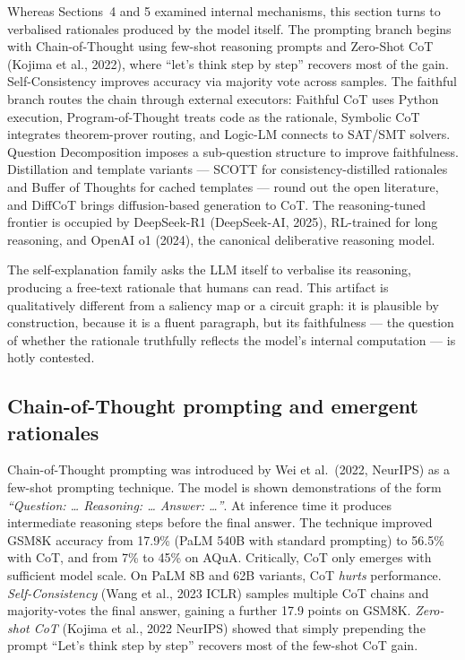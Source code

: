 \documentclass{article}
\begin{document}
Whereas Sections~4 and 5 examined internal mechanisms, this section turns to verbalised rationales produced by the model itself. The prompting branch begins with Chain-of-Thought \citep{wei2022chainofthoughtprom} using few-shot reasoning prompts and Zero-Shot CoT (Kojima et al., 2022), where ``let's think step by step'' recovers most of the gain. Self-Consistency \citep{wang2023scottselfconsisten} improves accuracy via majority vote across samples. The faithful branch routes the chain through external executors: Faithful CoT \citep{lyu2023faithfulchainoftho} uses Python execution, Program-of-Thought \citep{chen2024diahaluadialoguele} treats code as the rationale, Symbolic CoT \citep{xu2024faithfullogicalrea} integrates theorem-prover routing, and Logic-LM \citep{pan2023logiclmempoweringl} connects to SAT/SMT solvers. Question Decomposition \citep{radhakrishnan2023questiondecomposit} imposes a sub-question structure to improve faithfulness. Distillation and template variants --- SCOTT \citep{wang2023scottselfconsisten} for consistency-distilled rationales and Buffer of Thoughts \citep{yang2024bufferofthoughtsth} for cached templates --- round out the open literature, and DiffCoT \citep{cao2026diffcotdiffusionst} brings diffusion-based generation to CoT. The reasoning-tuned frontier is occupied by DeepSeek-R1 (DeepSeek-AI, 2025), RL-trained for long reasoning, and OpenAI o1 (2024), the canonical deliberative reasoning model.

The self-explanation family asks the LLM itself to verbalise its reasoning, producing a free-text rationale that humans can read. This artifact is qualitatively different from a saliency map or a circuit graph: it is plausible by construction, because it is a fluent paragraph, but its faithfulness --- the question of whether the rationale truthfully reflects the model's internal computation --- is hotly contested.

\subsection{Chain-of-Thought prompting and emergent rationales}\label{chain-of-thought-prompting-and-emergent-rationales}

Chain-of-Thought prompting was introduced by Wei et al.~(2022, NeurIPS) as a few-shot prompting technique. The model is shown demonstrations of the form \emph{``Question: \ldots{} Reasoning: \ldots{} Answer: \ldots{}''}. At inference time it produces intermediate reasoning steps before the final answer. The technique improved GSM8K accuracy from 17.9\% (PaLM 540B with standard prompting) to 56.5\% with CoT, and from 7\% to 45\% on AQuA. Critically, CoT only emerges with sufficient model scale. On PaLM 8B and 62B variants, CoT \emph{hurts} performance. \emph{Self-Consistency} (Wang et al., 2023 ICLR) samples multiple CoT chains and majority-votes the final answer, gaining a further 17.9 points on GSM8K. \emph{Zero-shot CoT} (Kojima et al., 2022 NeurIPS) showed that simply prepending the prompt ``Let's think step by step'' recovers most of the few-shot CoT gain.
\end{document}
